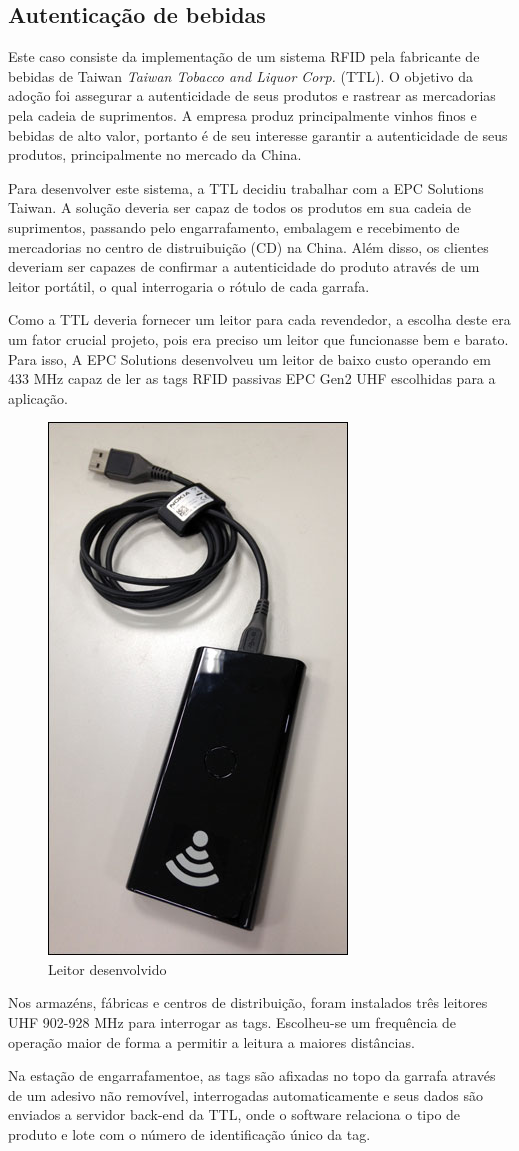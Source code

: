 

\subsection{Autenticação de bebidas}
Este caso consiste da implementação de um sistema RFID pela fabricante de bebidas de Taiwan \textit{Taiwan Tobacco and Liquor Corp.} (TTL). O objetivo da adoção foi assegurar a autenticidade de seus produtos e rastrear as mercadorias pela cadeia de suprimentos. 
A empresa produz principalmente vinhos finos e bebidas de alto valor, portanto é de seu interesse garantir a autenticidade de seus produtos, principalmente no mercado da China.

Para desenvolver este sistema, a TTL decidiu trabalhar com a EPC Solutions Taiwan. A solução deveria ser capaz de todos os produtos em sua cadeia de suprimentos, passando pelo engarrafamento, embalagem e recebimento de mercadorias no centro de distruibuição (CD) na China.  Além disso, os clientes deveriam ser capazes de confirmar a autenticidade do produto através de um leitor portátil, o qual interrogaria o rótulo de cada garrafa.

Como a TTL deveria fornecer um leitor para cada revendedor, a escolha deste era um fator crucial projeto, pois era preciso um leitor que funcionasse bem e barato. Para isso, A EPC Solutions desenvolveu um leitor de baixo custo operando em 433 MHz capaz de ler as tags RFID passivas EPC Gen2 UHF escolhidas para a aplicação. 

\begin{figure}[h!]
\centering
\includegraphics[width=0.2\linewidth]{leitor_ttl}
\caption{Leitor desenvolvido}
\label{fig:leitor_ttl}
\end{figure}
   
Nos armazéns, fábricas e centros de distribuição, foram instalados três leitores UHF 902-928 MHz para interrogar as tags. Escolheu-se um frequência de operação maior de forma a permitir a leitura a maiores distâncias.

Na estação de engarrafamentoe, as tags são afixadas no topo da garrafa através de um adesivo não removível, interrogadas automaticamente e seus dados são enviados a servidor back-end da TTL, onde o software relaciona o tipo de produto e lote com o número de identificação único da tag.

